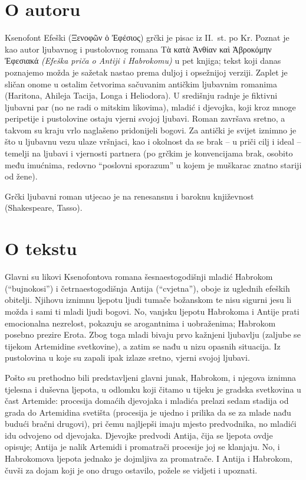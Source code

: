 \section*{O autoru}

Ksenofont Efeški (Ξενοφῶν ὁ Ἐφέσιος) grčki je pisac iz II.~st. po Kr. Poznat je kao autor ljubavnog i pustolovnog romana Τὰ κατὰ Ἀνθίαν καὶ Ἁβροκόμην Ἐφεσιακά \textit{(Efeška priča o Antiji i Habrokomu)} u pet knjiga; tekst koji danas poznajemo možda je sažetak nastao prema duljoj i opsežnijoj verziji. Zaplet je sličan onome u ostalim četvorima sačuvanim antičkim ljubavnim romanima (Haritona, Ahileja Tacija, Longa i Heliodora). U središnju radnje je fiktivni ljubavni par (no ne radi o mitskim likovima), mladić i djevojka, koji kroz mnoge peripetije i pustolovine ostaju vjerni svojoj ljubavi. Roman završava sretno, a takvom su kraju vrlo naglašeno pridonijeli bogovi. Za antički je svijet iznimno je što u ljubavnu vezu ulaze vršnjaci, kao i okolnost da se brak – u priči cilj i ideal – temelji na ljubavi i vjernosti partnera (po grčkim je konvencijama brak, osobito među imućnima, redovno ``poslovni sporazum'' u kojem je muškarac znatno stariji od žene).

Grčki ljubavni roman utjecao je na renesansnu i baroknu književnost (Shakespeare, Tasso).

\section*{O tekstu}

Glavni su likovi Ksenofontova romana šesnaestogodišnji mladić Habrokom (``bujnokosi'') i četrnaestogodišnja Antija (``cvjetna''), oboje iz uglednih efeških obitelji. Njihovu iznimnu ljepotu ljudi tumače božanskom te nisu sigurni jesu li možda i sami ti mladi ljudi bogovi. No, vanjsku ljepotu Habrokoma i Antije prati emocionalna nezrelost, pokazuju se arogantnima i uobraženima; Habrokom posebno prezire Erota. Zbog toga mladi bivaju prvo kažnjeni ljubavlju (zaljube se tijekom Artemidine svetkovine), a zatim se nađu u nizu opasnih situacija. Iz pustolovina u koje su zapali ipak izlaze sretno, vjerni svojoj ljubavi.

Pošto su prethodno bili predstavljeni glavni junak, Habrokom, i njegova iznimna tjelesna i duševna ljepota, u odlomku koji čitamo u tijeku je gradska svetkovina u čast Artemide: procesija domaćih djevojaka i mladića prelazi sedam stadija od grada do Artemidina svetišta (procesija je ujedno i prilika da se za mlade nađu budući bračni drugovi), pri čemu najljepši imaju mjesto predvodnika, no mladići idu odvojeno od djevojaka. Djevojke predvodi Antija, čija se ljepota ovdje opisuje; Antija je nalik Artemidi i promatrači procesije joj se klanjaju. No, i Habrokomova ljepota jednako je dojmljiva za promatrače. I Antija i Habrokom, čuvši za dojam koji je ono drugo ostavilo, požele se vidjeti i upoznati.

